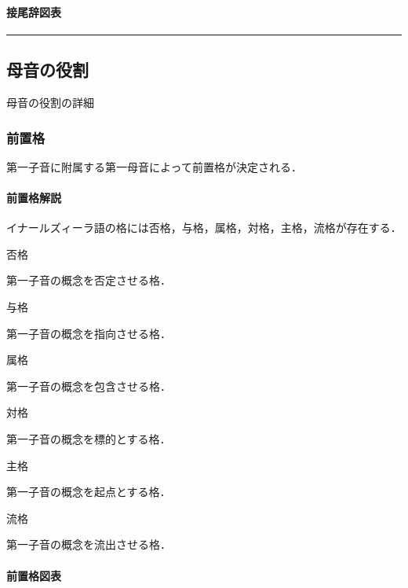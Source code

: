 \documentclass[
  japanese,
]{article}
\providecommand{\tightlist}{%
  \setlength{\itemsep}{0pt}\setlength{\parskip}{0pt}}
\begin{document}
\paragraph{接尾辞図表}\label{subsection4.6.2}

\begin{center}\rule{0.5\linewidth}{0.5pt}\end{center}

\subsection{母音の役割}\label{chapter5}

母音の役割の詳細

\subsubsection{前置格}\label{section5.1}

第一子音に附属する第一母音によって前置格が決定される．

\paragraph{前置格解説}\label{subsection5.1.1}

イナールズィーラ語の格には否格，与格，属格，対格，主格，流格が存在する．

\begin{description}
\tightlist
\item[{◌a◌◌}]
否格

第一子音の概念を否定させる格．
\item[{◌e◌◌}]
与格

第一子音の概念を指向させる格．
\item[{◌i◌◌}]
属格

第一子音の概念を包含させる格．
\item[{◌o◌◌}]
対格

第一子音の概念を標的とする格．
\item[{◌u◌◌}]
主格

第一子音の概念を起点とする格．
\item[{◌w◌◌}]
流格

第一子音の概念を流出させる格．
\end{description}

\paragraph{前置格図表}\label{subsection5.1.2}
\end{document}
